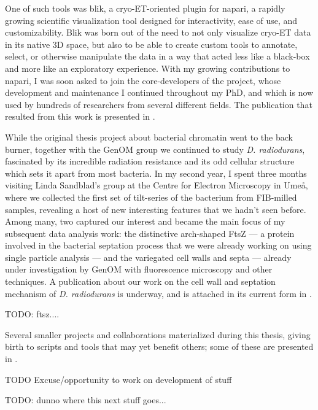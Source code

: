 One of such tools was blik, a cryo-ET-oriented plugin for napari, a rapidly growing scientific visualization tool designed for interactivity, ease of use, and customizability.
Blik was born out of the need to not only visualize cryo-ET data in its native 3D space, but also to be able to create custom tools to annotate, select, or otherwise manipulate the data in a way that acted less like a black-box and more like an exploratory experience.
With my growing contributions to napari, I was soon asked to join the core-developers of the project, whose development and maintenance I continued throughout my PhD, and which is now used by hundreds of researchers from several different fields.
The publication that resulted from this work is presented in .

While the original thesis project about bacterial chromatin went to the back burner, together with the GenOM group we continued to study \textit{D. radiodurans}, fascinated by its incredible radiation resistance and its odd cellular structure which sets it apart from most bacteria.
In my second year, I spent three months visiting Linda Sandblad's group at the Centre for Electron Microscopy in Umeå, where we collected the first set of tilt-series of the bacterium from FIB-milled samples, revealing a host of new interesting features that we hadn't seen before.
Among many, two captured our interest and became the main focus of my subsequent data analysis work: the distinctive arch-shaped FtsZ --- a protein involved in the bacterial septation process that we were already working on using single particle analysis --- and the variegated cell walls and septa --- already under investigation by GenOM with fluorescence microscopy and other techniques.
A publication about our work on the cell wall and septation mechanism of \textit{D. radiodurans} is underway, and is attached in its current form in .

TODO: ftsz....

Several smaller projects and collaborations materialized during this thesis, giving birth to scripts and tools that may yet benefit others; some of these are presented in . 

TODO Excuse/opportunity to work on development of stuff

TODO: dunno where this next stuff goes...

